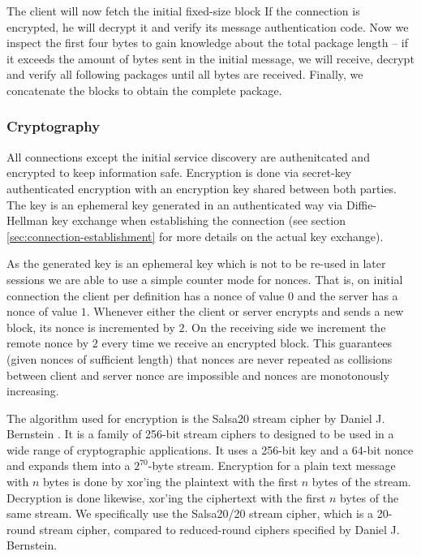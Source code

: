 The client will now fetch the initial fixed-size block
If the connection is encrypted, he will decrypt it and verify its message authentication code.
Now we inspect the first four bytes to gain knowledge about the total package length -- if it exceeds the amount of bytes sent in the initial message, we will receive, decrypt and verify all following packages until all bytes are received.
Finally, we concatenate the blocks to obtain the complete package.

\subsubsection{Cryptography}

All connections except the initial service discovery are authenitcated and encrypted to keep information safe.
Encryption is done via secret-key authenticated encryption with an encryption key shared between both parties.
The key is an ephemeral key generated in an authenticated way via Diffie-Hellman key exchange when establishing the connection (see section \ref{sec:connection-establishment} for more details on the actual key exchange).

As the generated key is an ephemeral key which is not to be re-used in later sessions we are able to use a simple counter mode for nonces.
That is, on initial connection the client per definition has a nonce of value $0$ and the server has a nonce of value $1$.
Whenever either the client or server encrypts and sends a new block, its nonce is incremented by $2$.
On the receiving side we increment the remote nonce by $2$ every time we receive an encrypted block.
This guarantees (given nonces of sufficient length) that nonces are never repeated as collisions between client and server nonce are impossible and nonces are monotonously increasing.

The algorithm used for encryption is the Salsa20 stream cipher by Daniel J. Bernstein \cite{bernstein2008salsa}.
It is a family of 256-bit stream ciphers to designed to be used in a wide range of cryptographic applications.
It uses a 256-bit key and a 64-bit nonce and expands them into a $2^{70}$-byte stream.
Encryption for a plain text message with $n$ bytes is done by xor'ing the plaintext with the first $n$ bytes of the stream.
Decryption is done likewise, xor'ing the ciphertext with the first $n$ bytes of the same stream.
We specifically use the Salsa20/20 stream cipher, which is a 20-round stream cipher, compared to reduced-round ciphers specified by Daniel J. Bernstein.

